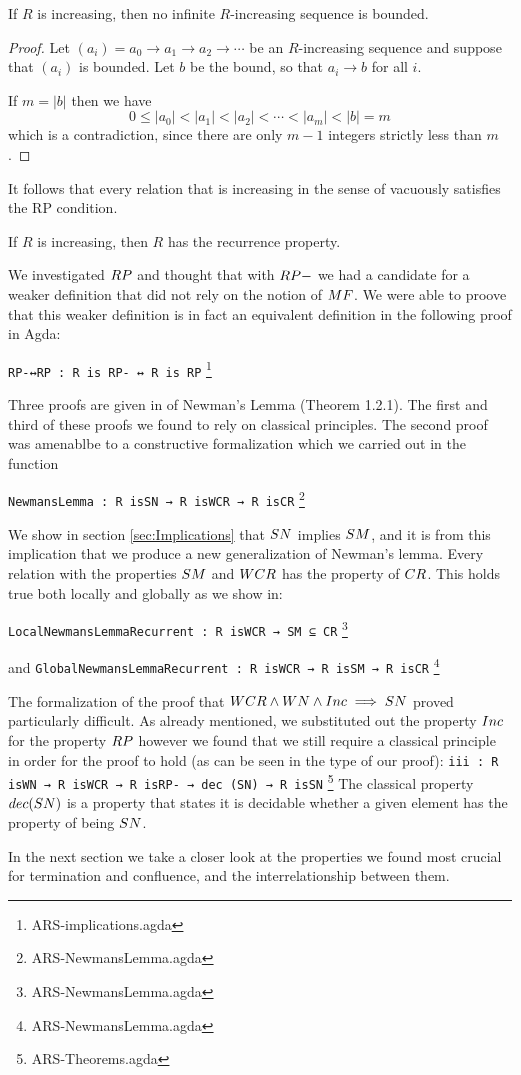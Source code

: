 \begin{proposition}
    If $R$ is increasing, then no infinite $R$-increasing sequence is bounded.
\end{proposition}
\begin{proof}
    Let $(a_i) = a_0 \to a_1 \to a_2 \to \cdots$ be an $R$-increasing sequence
    and suppose that $(a_i)$ is bounded.  Let $b$ be the bound, so that $a_i \to b$ for all $i$.

    If $m = |b|$ then we have
    \[ 0 \le |a_0| < |a_1| < |a_2| < \cdots < |a_m| < |b| = m \]
    which is a contradiction, since there are only $m-1$ integers strictly less than $m$.
\end{proof}
It follows that every relation that is increasing in the sense of \terese
vacuously satisfies the RP condition.

\begin{corollary}
    If $R$ is increasing, then $R$ has the recurrence property.
\end{corollary}

We investigated $\RP$ and thought that with $\RPm$ we had a candidate for a weaker definition that 
did not rely on the notion of $\MF$. We were able to proove that this weaker definition is 
in fact an equivalent definition in the following proof in Agda: 

\verb|RP-↔RP : R is RP- ↔ R is RP| \footnote{ARS-implications.agda}

Three proofs are given in \terese of Newman's Lemma (Theorem 1.2.1). The first and third of 
these proofs we found to rely on classical principles. The second proof was amenablbe to a 
constructive formalization which we carried out in the function 


\verb|NewmansLemma : R isSN → R isWCR → R isCR| \footnote{ARS-NewmansLemma.agda}

We show in section \ref{sec:Implications} that $\SN$ implies $\SM$, and it is from this implication 
that we produce a new generalization of Newman's lemma. Every relation with the properties 
$\SM$ and $\WCR$ has the property of $\CR$. This holds true both locally and globally as we show in:

\verb|LocalNewmansLemmaRecurrent : R isWCR → SM ⊆ CR| \footnote{ARS-NewmansLemma.agda}

and \verb|GlobalNewmansLemmaRecurrent : R isWCR → R isSM → R isCR| \footnote{ARS-NewmansLemma.agda}

The formalization of the proof that $\WCR \land \WN \land \Inc \implies \SN$ proved particularly difficult. 
As already mentioned, we substituted out the property $\Inc$ for the property $\RP$ however 
we found that we still require a classical principle in order for the proof to hold (as can be seen in the type of our proof):
\verb|iii : R isWN → R isWCR → R isRP- → dec (SN) → R isSN| \footnote{ARS-Theorems.agda}
The classical property $\decSN$ is a property that states it is decidable whether a given 
element has the property of being $\SN$. 

In the next section we take a closer look at the properties we found most crucial for termination and confluence, and the interrelationship between them.

